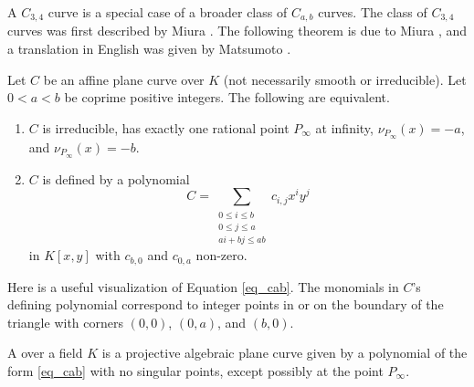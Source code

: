 A $C_{3,4}$ curve is a special case of a broader class of $C_{a,b}$ curves.
The class of $C_{3,4}$ curves was first described by Miura \cite{miura97}.
The following theorem is due to Miura \cite{miura97},
and a translation in English was given by Matsumoto \cite{matsumoto98}.
\begin{theorem}
  Let $C$ be an affine plane curve over $K$ (not necessarily smooth or irreducible).
  Let $0 < a < b$ be coprime positive integers.
  The following are equivalent.
  \begin{enumerate}[label=(\roman*)]
    \item $C$ is irreducible,
          has exactly one rational point $P_\infty$ at infinity,
          $\nu_{P_\infty}(x) = -a$, and
          $\nu_{P_\infty}(x) = -b$.
    \item $C$ is defined by a polynomial
          \begin{equation}
            \label{eq_cab}
            C = \sum_{\substack{0 \leq i \leq b \\ 0 \leq j \leq a \\ ai + bj \leq ab }}c_{i,j}x^iy^j
          \end{equation}
          in $K[x,y]$ with $c_{b,0}$ and $c_{0,a}$ non-zero.
  \end{enumerate}
\end{theorem}
Here is a useful visualization of Equation \ref{eq_cab}.
The monomials in $C$'s defining polynomial correspond to integer points
in or on the boundary of the triangle with corners $(0, 0)$, $(0, a)$, and $(b, 0)$.
\begin{comment}
\begin{definition}
  \label{def_cab_curve}
  A \defn{$C_{a,b}$ curve} over a field $K$
  is a projective algebraic plane curve given by an affine polynomial
  \[ C = \sum_{\substack{0 \leq i \leq b \\ 0 \leq j \leq a \\ ai + bj \leq ab }}c_{i,j}x^iy^j \]
  where
  \begin{enumerate}[label=(\roman*)]
    \item $c_{b,0}$ and $c_{0,a}$ are non-zero;
    \item $C$ is irreducible over $\bar K$;
    \item $C$ has no singular points, except possibly at infinity.
  \end{enumerate}
\end{definition}
\end{comment}
\begin{definition}
  \label{def_cab_curve}
  A  over a field $K$ is a projective algebraic plane curve
  given by a polynomial of the form \ref{eq_cab} with no singular points,
  except possibly at the point $P_\infty$.
\end{definition}

